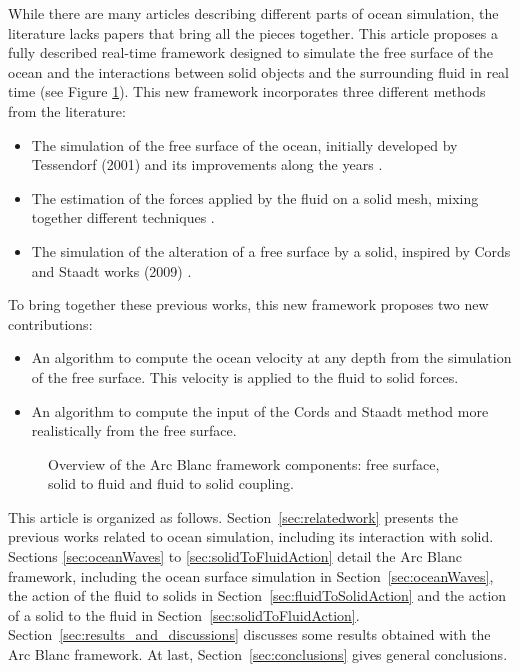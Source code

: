 \documentclass[final]{jcgt}
\def\framework{the Arc Blanc framework\xspace}
\begin{document}
While there are many articles describing different parts of ocean simulation, the literature lacks papers that bring all the pieces together.
This article proposes a fully described real-time framework designed to simulate the free surface of the ocean and the interactions between solid objects and the surrounding fluid in real time (see Figure \ref{fig:overviewFramework}).
This new framework incorporates three different methods from the literature:
\begin{itemize}
	\item The simulation of the free surface of the ocean, initially developed by Tessendorf (2001) \cite{tessendorfSimulating2001} and its improvements along the years \cite{horvathEmpiricalDirectionalWave2015,tessendorfGilliganPrototypeFramework2017}.
	\item The estimation of the forces applied by the fluid on a solid mesh, mixing together different techniques \cite{yukselRealtimeWaterWaves2010,kellomakiRigidBodyInteraction2014}.
	\item The simulation of the alteration of a free surface by a solid, inspired by Cords and Staadt works (2009) \cite{cordsRealTimeOpenWater2009}.
\end{itemize}
To bring together these previous works, this new framework proposes two new contributions:
\begin{itemize}
	\item An algorithm to compute the ocean velocity at any depth from the simulation of the free surface. This velocity is applied to the fluid to solid forces.
	\item An algorithm to compute the input of the Cords and Staadt method more realistically from the free surface.
\end{itemize}



\begin{figure}
	\centering
	
	\caption{Overview of \framework components: free surface, solid to fluid and fluid to solid coupling.}
	\label{fig:overviewFramework}
\end{figure}

This article is organized as follows.
Section~\ref{sec:relatedwork} presents the previous works related to ocean simulation, including its interaction with solid.
Sections \ref{sec:oceanWaves} to \ref{sec:solidToFluidAction} detail \framework, including the ocean surface simulation in Section~\ref{sec:oceanWaves}, the action of the fluid to solids in Section~\ref{sec:fluidToSolidAction} and the action of a solid to the fluid in Section~\ref{sec:solidToFluidAction}.
Section~\ref{sec:results_and_discussions} discusses some results obtained with \framework.
At last, Section~\ref{sec:conclusions} gives general conclusions.
\end{document}
